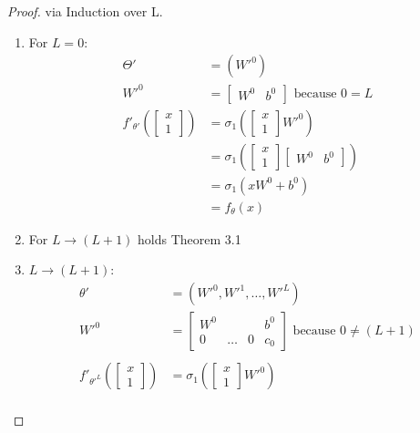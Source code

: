 \documentclass[a4paper]{article}
\theoremstyle{definition}
\begin{document}
\begin{proof}
    via Induction over L.\\
    \begin{enumerate}
        \item For $L=0$:\\
        \begin{align}
            \Theta'&=(W'^0) \\
            W'^0 &= \begin{bmatrix}
                W^0 & b^0
            \end{bmatrix} \text{ because } 0=L \\
            f'_{\theta'}(\begin{bmatrix}     x\\     1 \end{bmatrix}) &= \sigma_1(\begin{bmatrix}     x\\     1 \end{bmatrix}W'^0) \\
            &= \sigma_1(\begin{bmatrix}     x\\     1 \end{bmatrix}\begin{bmatrix}
                W^0 & b^0
            \end{bmatrix})\\
            &= \sigma_1(xW^0 + b^0)\\
            &= f_{\theta}(x)
        \end{align}
        \item For $L \rightarrow (L+1)$ holds Theorem 3.1
        \item $L \rightarrow (L+1)$:\\
        \begin{align}
            \theta' &= (W'^0, W'^1,\dots, W'^L) \\
            W'^{0} &= \begin{bmatrix}
                W^0 & & & b^0\\
                0 & \dots & 0 & c_0
            \end{bmatrix} \text{ because } 0\neq(L+1)\\
            \\
            f'_{\theta'^L}(\begin{bmatrix}     x\\     1 \end{bmatrix}) &= \sigma_1(\begin{bmatrix}     x\\     1 \end{bmatrix}W'^0)\\

\end{align}
\end{enumerate}
\end{proof}
\end{document}
